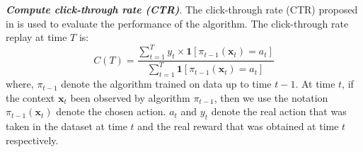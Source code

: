 \textbf{\textit{Compute click-through rate (CTR)}}. The click-through rate (CTR) proposed in \cite{ctr} is used to evaluate the performance of the algorithm. The click-through rate replay at time $T$ is:
    \begin{equation}
        C(T)=\frac{\sum_{t=1}^{T} y_{t} \times \mathbf{1}\left[\pi_{t-1}\left(\mathbf{x}_{t}\right)=a_{t}\right]}{\sum_{t=1}^{T} \mathbf{1}\left[\pi_{t-1}\left(\mathbf{x}_{t}\right)=a_{t}\right]}
    \end{equation}
where, $\pi_{t-1}$ denote the algorithm trained on data up to time $t-1$. At time $t$, if the context $\mathbf{x}_{t}$ been observed by algorithm $\pi_{t-1}$, then we use the notation $\pi_{t-1}(\mathbf{x}_{t})$ denote the chosen action. $a_{t}$ and $y_{t}$ denote the real action that was taken in the dataset at time $t$ and the real reward that was obtained at time $t$ respectively.

